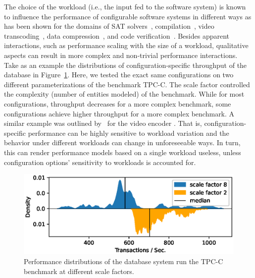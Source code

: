 The choice of the workload (i.e., the input fed to the software system) is known to influence the performance of configurable software systems in different ways as has been shown for the domains of SAT solvers~\cite{falkner_sat_solvers_2015,satzilla_2008}, compilation~\cite{ding_compilation_2015,plotnikov_compilation_2013}, video transcoding~\cite{maxiaguine_workload_2004,alves_sampling_2020}, data compression~\cite{khavari_compression_2019}, and code verification~\cite{koc_satune_2021}. Besides apparent interactions, such as performance scaling with the size of a workload, qualitative aspects can result in more complex and non-trivial performance interactions.
{\color{novelblue}
Take as an example the distributions of configuration-specific throughput of the database \htwo in Figure~\ref{fig:h2_intro}. Here, we tested the exact same configurations on two different parameterizations of the benchmark TPC-C. The scale factor controlled the complexity (number of entities modeled) of the benchmark. While for most configurations, throughput decreases for a more complex benchmark, some configurations achieve higher throughput for a more complex benchmark. A similar example was outlined by~\citeauthor{alves_sampling_2020} for the video encoder \xzwo. That is, configuration-specific performance can be highly sensitive to workload variation and the behavior under different workloads can change in unforeseeable ways. In turn, this can render performance models based on a single workload useless, unless configuration options’ sensitivity to workloads is accounted for.
}
\begin{figure}
	\centering
	\includegraphics[width=0.95\linewidth]{images/h2_motivation.eps}
	\caption{Performance distributions of the database system \htwo run the \textsf{TPC-C} benchmark at different scale factors.}
	\label{fig:h2_intro}
\end{figure}


